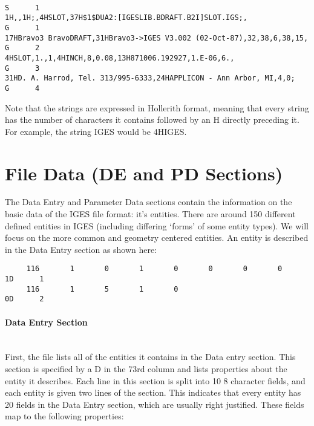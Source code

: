 \begin{Verbatim}
                                                                        S      1
1H,,1H;,4HSLOT,37H$1$DUA2:[IGESLIB.BDRAFT.B2I]SLOT.IGS;,                G      1
17HBravo3 BravoDRAFT,31HBravo3->IGES V3.002 (02-Oct-87),32,38,6,38,15,  G      2
4HSLOT,1.,1,4HINCH,8,0.08,13H871006.192927,1.E-06,6.,                   G      3
31HD. A. Harrod, Tel. 313/995-6333,24HAPPLICON - Ann Arbor, MI,4,0;     G      4
\end{Verbatim}

Note that the strings are expressed in Hollerith format, meaning that
every string has the number of characters it contains followed by an H
directly preceding it. For example, the string IGES would be 4HIGES.

\section*{File Data (DE and PD
Sections)}\label{file-data-de-and-pd-sections}

The Data Entry and Parameter Data sections contain the information on
the basic data of the IGES file format: it's entities. There are around
150 different defined entities in IGES (including differing `forms' of
some entity types). We will focus on the more common and geometry
centered entities. An entity is described in the Data Entry section as
shown here:

\begin{Verbatim}
     116       1       0       1       0       0       0       0       1D      1
     116       1       5       1       0                               0D      2
\end{Verbatim}

\paragraph{Data Entry Section}\label{data-entry-section} \\
First, the file lists all of the entities it contains in the Data entry
section. This section is specified by a D in the 73rd column and lists
properties about the entity it describes. Each line in this section is
split into 10 8 character fields, and each entity is given two lines of
the section. This indicates that every entity has 20 fields in the Data
Entry section, which are usually right justified. These fields map to
the following properties:


